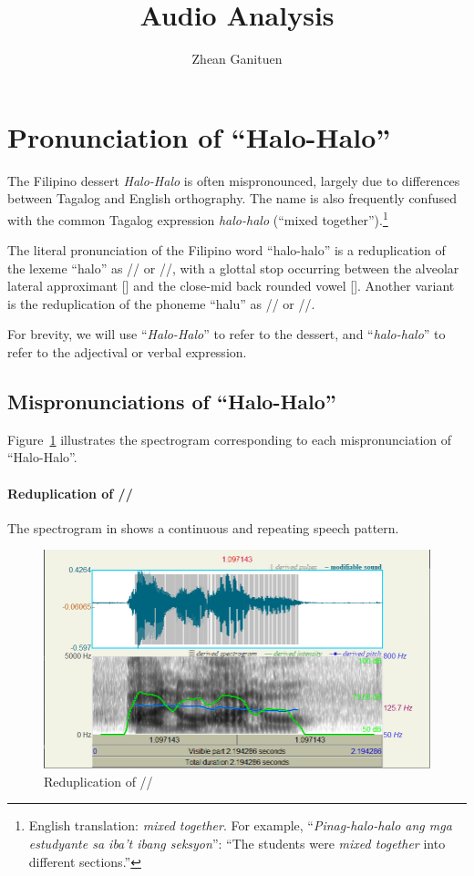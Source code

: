 \documentclass{article}
\title{Audio Analysis}
\author{Zhean Ganituen}
\begin{document}
\maketitle

\section{Pronunciation of ``Halo-Halo''}

The Filipino dessert \emph{Halo-Halo} is often mispronounced, largely due to
differences between Tagalog and English orthography. The name is also
frequently confused with the common Tagalog expression \emph{halo-halo}
(``mixed together'').\footnote{English translation: \emph{mixed together}. For
    example, ``\emph{Pinag-halo-halo ang mga estudyante sa iba't ibang seksyon}'':
    ``The students were \emph{mixed together} into different sections.''}

The literal pronunciation of the Filipino word ``halo-halo'' is a reduplication
of the lexeme ``halo'' as // or //, with a glottal
stop occurring between the alveolar lateral approximant [] and the
close-mid back rounded vowel []. Another variant is the
reduplication of the phoneme ``halu'' as // or //.

For brevity, we will use ``\emph{Halo-Halo}'' to refer to the dessert, and
``\emph{halo-halo}'' to refer to the adjectival or verbal expression.

\subsection{Mispronunciations of ``Halo-Halo''}

Figure~\ref{fig:halo} illustrates the spectrogram corresponding to each
mispronunciation of ``Halo-Halo''.

\paragraph{Reduplication of //} The spectrogram in
 shows a continuous and repeating speech pattern.

\begin{figure}
    \centering
    \includegraphics[width=0.65\linewidth]{img/halo.png}
    \caption{Reduplication of //}\label{fig:halo}
\end{figure}
\end{document}
